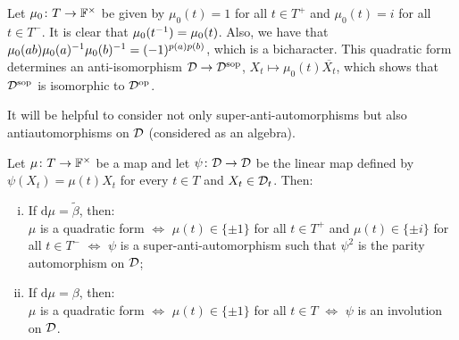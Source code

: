 \begin{ex}\label{ex:quadratic-form-polarization-parity}
    Let $\mu_0\colon T \to \mathbb{F}^\times$ be given by $\mu_0(t) = 1$ for all $t\in T^+$ and $\mu_0(t) = i$ for all $t\in T^-$. 
    It is clear that $\mu_0(t^{-1}) = \mu_0(t)$. 
    Also, we have that $\mu_0(ab) \mu_0(a)^{-1} \mu_0(b)^{-1} = (-1)^{p(a)p(b)}$, which is a bicharacter. 
    This quadratic form determines an anti-isomorphism $\mathcal{D} \to \mathcal{D}^{\mathrm{sop}}$, $X_t\mapsto \mu_0(t)\overline{X_t}$, which shows that $\mathcal{D}^{\mathrm{sop}}$ is isomorphic to $\mathcal{D}^{\mathrm{op}}$.
\end{ex}


It will be helpful to consider not only super-anti-automorphisms but also antiautomorphisms on $\mathcal{D}$ (considered as an algebra).

\begin{prop}
    Let $\mu\colon T \to \mathbb{F}^\times$ be a map and let $\psi\colon \mathcal{D} \to \mathcal{D}$ be the linear map defined by 
    $\psi(X_t) = \mu(t) X_t$ for every $t\in T$ and $X_t \in \mathcal{D}_t$. 
    Then: 
    \begin{enumerate}[(i)]
        \item If $\mathrm{d}\mu = \tilde\beta$, then: \\
        $\mu$ is a quadratic form $\iff$ $\mu(t)\in \{ \pm 1 \}$ for all $t \in T^+$ and $\mu(t)\in \{ \pm i \}$ for all $t \in T^-$ $\iff$ $\psi$ is a super-anti-automorphism such that $\psi^2$ is the parity automorphism on $\mathcal{D}$; \label{item:super-anti-auto-quadratic}
        \item If $\mathrm{d}\mu = \beta$, then:\\
        $\mu$ is a quadratic form $\iff$ $\mu(t) \in \{\pm 1\}$ for all $t\in T$ $\iff$ $\psi$ is
        an involution on $\mathcal{D}$. \label{item:anti-auto-quadratic}
    \end{enumerate}
\end{prop}

